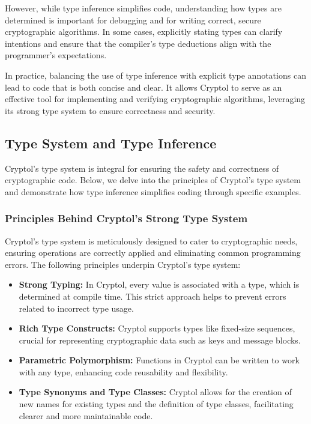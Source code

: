 However, while type inference simplifies code, understanding how types are determined is important for debugging and for writing correct, secure cryptographic algorithms. In some cases, explicitly stating types can clarify intentions and ensure that the compiler's type deductions align with the programmer’s expectations.

In practice, balancing the use of type inference with explicit type annotations can lead to code that is both concise and clear. It allows Cryptol to serve as an effective tool for implementing and verifying cryptographic algorithms, leveraging its strong type system to ensure correctness and security.

\subsection{Type System and Type Inference}

Cryptol's type system is integral for ensuring the safety and correctness of cryptographic code. Below, we delve into the principles of Cryptol's type system and demonstrate how type inference simplifies coding through specific examples.

\subsubsection{Principles Behind Cryptol's Strong Type System}
Cryptol's type system is meticulously designed to cater to cryptographic needs, ensuring operations are correctly applied and eliminating common programming errors. The following principles underpin Cryptol's type system:

\begin{itemize}
	\item \textbf{Strong Typing:} In Cryptol, every value is associated with a type, which is determined at compile time. This strict approach helps to prevent errors related to incorrect type usage.
	\item \textbf{Rich Type Constructs:} Cryptol supports types like fixed-size sequences, crucial for representing cryptographic data such as keys and message blocks.
	\item \textbf{Parametric Polymorphism:} Functions in Cryptol can be written to work with any type, enhancing code reusability and flexibility.
	\item \textbf{Type Synonyms and Type Classes:} Cryptol allows for the creation of new names for existing types and the definition of type classes, facilitating clearer and more maintainable code.
\end{itemize}

